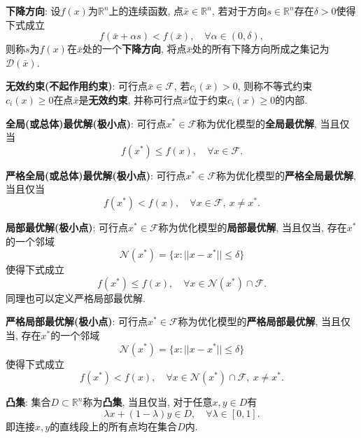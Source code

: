\documentclass[12pt, a4paper, oneside]{ctexart}
\let\leq=\leqslant %
\let\geq=\geqslant %
\def\R{\mathbb{R}}          %
\begin{document}
\textbf{下降方向}: 设$f(x)$为$\R^n$上的连续函数, 点$\bar{x}\in\R^n$, 若对于方向$s\in\R^n$存在$\delta >0$使得下式成立
\begin{equation*}
    f(\bar{x}+\alpha s) < f(\bar{x}),\quad\forall \alpha\in(0,\delta),
\end{equation*}
则称$s$为$f(x)$在$\bar{x}$处的一个\textbf{下降方向}, 将点$\bar{x}$处的所有下降方向所成之集记为$\mathcal{D}(\bar{x})$.

\textbf{无效约束(不起作用约束)}: 可行点$\bar{x}\in\mathcal{F}$, 若$c_i(\bar{x}) > 0$, 则称不等式约束$c_i(x)\geq 0$在点$\bar{x}$是\textbf{无效约束}, 并称可行点$\bar{x}$位于约束$c_i(x)\geq 0$的内部.

\textbf{全局(或总体)最优解(极小点)}: 可行点$x^*\in \mathcal{F}$称为优化模型的\textbf{全局最优解}, 当且仅当
\begin{equation*}
    f(x^*)\leq f(x),\quad \forall x\in \mathcal{F}.
\end{equation*}

\textbf{严格全局(或总体)最优解(极小点)}: 可行点$x^*\in \mathcal{F}$称为优化模型的\textbf{严格全局最优解}, 当且仅当
\begin{equation*}
    f(x^*)< f(x),\quad \forall x\in \mathcal{F},\ x\neq x^*.
\end{equation*}

\textbf{局部最优解(极小点)}: 可行点$x^*\in \mathcal{F}$称为优化模型的\textbf{局部最优解}, 当且仅当, 存在$x^*$的一个邻域
\begin{equation*}
    \mathcal{N}(x^*) = \{x:||x-x^*|| \leq \delta\}
\end{equation*}
使得下式成立
\begin{equation*}
    f(x^*)\leq f(x),\quad \forall x\in\mathcal{N}(x^*)\cap\mathcal{F}.
\end{equation*}
同理也可以定义严格局部最优解.

\textbf{严格局部最优解(极小点)}: 可行点$x^*\in \mathcal{F}$称为优化模型的\textbf{严格局部最优解}, 当且仅当, 存在$x^*$的一个邻域
\begin{equation*}
    \mathcal{N}(x^*) = \{x:||x-x^*|| \leq \delta\}
\end{equation*}
使得下式成立
\begin{equation*}
    f(x^*)< f(x),\quad \forall x\in\mathcal{N}(x^*)\cap\mathcal{F},\ x\neq x^*.
\end{equation*}

\textbf{凸集}: 集合$D\subset \R^n$称为\textbf{凸集}, 当且仅当, 对于任意$x,y\in D$有
\begin{equation*}
    \lambda x+(1-\lambda)y\in D,\quad\forall \lambda\in[0,1].
\end{equation*}
即连接$x, y$的直线段上的所有点均在集合$D$内.
\end{document}
